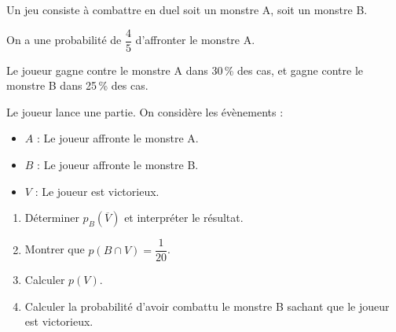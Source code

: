 \medskip

Un jeu consiste à combattre en duel soit un monstre A, soit un monstre B.

On a une probabilité de $\dfrac{4}{5}$ d’affronter le monstre A.

Le joueur gagne contre le monstre A dans 30\,\% des cas, et gagne contre le monstre
B dans 25\,\% des cas.

Le joueur lance une partie. On considère les évènements :

\begin{itemize}
\item $A$ : \og Le joueur affronte le monstre A. \fg
\item $B$ : \og Le joueur affronte le monstre B. \fg
\item $V$ : \og Le joueur est victorieux. \fg
\end{itemize}

\medskip

\begin{enumerate}
\item Déterminer $p_B\left(\overline{V}\right)$ et interpréter le résultat.
\item Montrer que $p(B \cap V) = \dfrac{1}{20}$.
\item Calculer $p(V)$.
\item Calculer la probabilité d’avoir combattu le monstre B sachant que le joueur est victorieux.
\end{enumerate}
